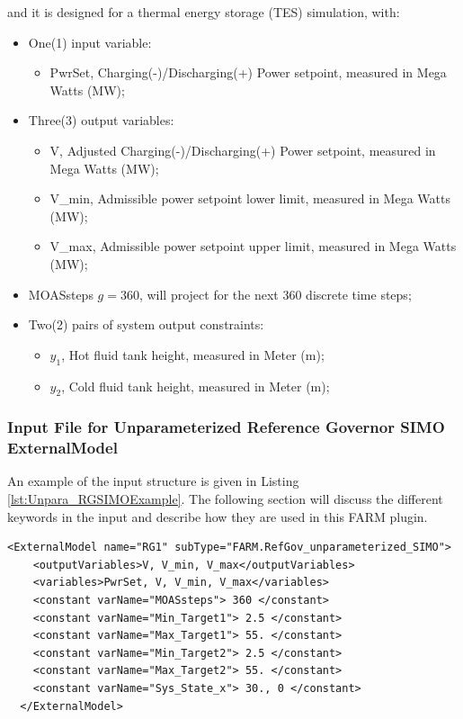and it is designed for a thermal energy storage (TES) simulation, with:
\begin{itemize}
  \item One(1) input variable:
  \begin{itemize}
    \item PwrSet, Charging(-)/Discharging(+) Power setpoint, measured in Mega Watts (MW);
  \end{itemize}
  \item Three(3) output variables:
  \begin{itemize}
    \item V, Adjusted Charging(-)/Discharging(+) Power setpoint, measured in Mega Watts (MW);
    \item V\_min, Admissible power setpoint lower limit, measured in Mega Watts (MW);
    \item V\_max, Admissible power setpoint upper limit, measured in Mega Watts (MW);
  \end{itemize}
  \item MOASsteps \begin{math} g=360 \end{math}, will project for the next 360 discrete time steps;
  \item Two(2) pairs of system output constraints:
  \begin{itemize}
    \item \begin{math} y_1 \end{math}, Hot fluid tank height, measured in Meter (m);
    \item \begin{math} y_2 \end{math}, Cold fluid tank height, measured in Meter (m);
  \end{itemize}
\end{itemize}

\subsubsection{Input File for Unparameterized Reference Governor SIMO ExternalModel}
\label{UnparaInputFile}
An example of the input structure is given in Listing \ref{lst:Unpara_RGSIMOExample}.
The following section will discuss the different keywords in the input and describe how they are used in this FARM plugin.

\begin{lstlisting}[style=XML,morekeywords={anAttribute},
caption=Reference Governor SIMO ExternalModel Example., label=lst:Unpara_RGSIMOExample]
  <ExternalModel name="RG1" subType="FARM.RefGov_unparameterized_SIMO">
    <outputVariables>V, V_min, V_max</outputVariables>
    <variables>PwrSet, V, V_min, V_max</variables>
    <constant varName="MOASsteps"> 360 </constant>
    <constant varName="Min_Target1"> 2.5 </constant>
    <constant varName="Max_Target1"> 55. </constant>
    <constant varName="Min_Target2"> 2.5 </constant>
    <constant varName="Max_Target2"> 55. </constant>
    <constant varName="Sys_State_x"> 30., 0 </constant>
  </ExternalModel>
\end{lstlisting}

